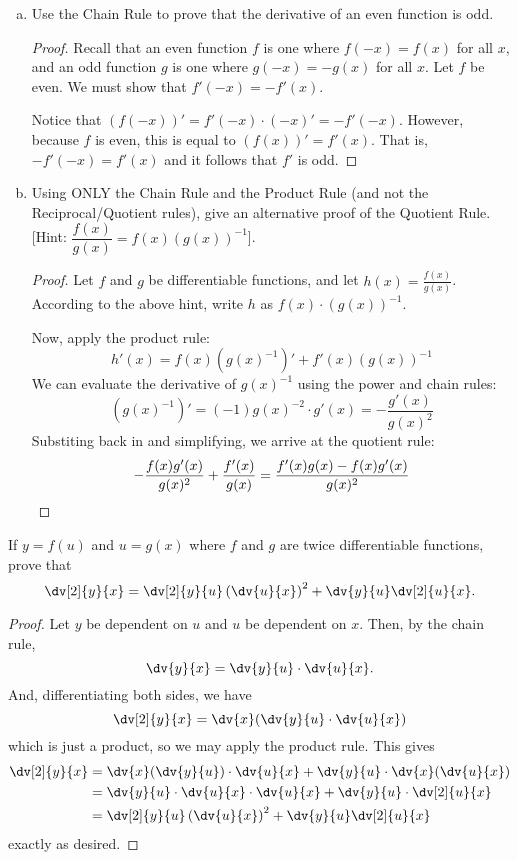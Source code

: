 \question \begin{enumerate}[(a)]
  \item Use the Chain Rule to prove that the derivative of an even function is odd.
        \begin{proof}
          Recall that an even function $f$ is one where $f(-x)=f(x)$ for all $x$,
          and an odd function $g$ is one where $g(-x)=-g(x)$ for all $x$.
          Let $f$ be even. We must show that $f'(-x) = -f'(x)$.
          
          Notice that $(f(-x))' = f'(-x)\cdot(-x)' = -f'(-x)$.
          However, because $f$ is even, this is equal to $(f(x))' = f'(x)$.
          That is, $-f'(-x) = f'(x)$ and it follows that $f'$ is odd.
        \end{proof}
  \item Using ONLY the Chain Rule and the Product Rule (and not the Reciprocal/Quotient rules),
        give an alternative proof of the Quotient Rule.
          [Hint: $\dfrac{f(x)}{g(x)}=f(x)(g(x))^{-1}$].
        \begin{proof}
          Let $f$ and $g$ be differentiable functions, and let $h(x)=\frac{f(x)}{g(x)}$. 
          According to the above hint, write $h$ as $f(x) \cdot (g(x))^{-1}$.

          Now, apply the product rule:
          \[ h'(x) = f(x)(g(x)^{-1})' + f'(x)(g(x))^{-1} \]
          We can evaluate the derivative of $g(x)^{-1}$ using the power and chain rules:
          \[ (g(x)^{-1})' = (-1)g(x)^{-2}\cdot g'(x) = -\frac{g'(x)}{g(x)^2} \]
          Substiting back in and simplifying, we arrive at the quotient rule:
          \[ -\frac{f(x)g'(x)}{g(x)^2} + \frac{f'(x)}{g(x)} = \frac{f'(x)g(x)-f(x)g'(x)}{g(x)^2} \qedhere \]
        \end{proof}
\end{enumerate}


\question If $y=f(u)$ and $u=g(x)$ where $f$ and $g$ are twice differentiable functions, prove that
\[ \dv[2]{y}{x} = \dv[2]{y}{u}\left(\dv{u}{x}\right)^2 + \dv{y}{u}\dv[2]{u}{x}. \]
\begin{proof}
  Let $y$ be dependent on $u$ and $u$ be dependent on $x$.
  Then, by the chain rule,
  \[ \dv{y}{x} = \dv{y}{u} \cdot \dv{u}{x}. \]
  And, differentiating both sides, we have
  \[ \dv[2]{y}{x} = \dv{x}(\dv{y}{u} \cdot \dv{u}{x}) \]
  which is just a product, so we may apply the product rule. This gives
  \begin{align*}
    \dv[2]{y}{x} & = \dv{x}(\dv{y}{u})\cdot\dv{u}{x} + \dv{y}{u}\cdot\dv{x}(\dv{u}{x})  \\
                 & = \dv{y}{u}\cdot\dv{u}{x}\cdot\dv{u}{x} + \dv{y}{u}\cdot\dv[2]{u}{x} \\
                 & = \dv[2]{y}{u}\left(\dv{u}{x}\right)^2 + \dv{y}{u}\dv[2]{u}{x}
  \end{align*}
  exactly as desired.
\end{proof}

